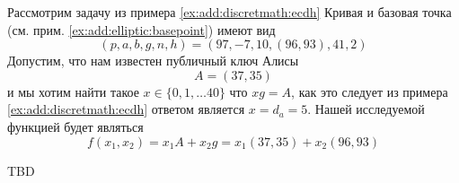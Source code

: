 \begin{example}
Рассмотрим задачу из примера \ref{ex:add:discretmath:ecdh}
Кривая и базовая точка (см. прим. \ref{ex:add:elliptic:basepoint})
имеют вид
\[
(p,a,b,g,n,h) = (97, -7, 10, (96,93), 41, 2)
\]
Допустим, что нам известен публичный ключ Алисы
\[
A = (37, 35)
\]
и мы хотим найти такое $x \in \{0,1, \dots 40\}$ что
$x g = A$, как это следует из примера \ref{ex:add:discretmath:ecdh}
ответом является $x = d_a  = 5$.
Нашей исследуемой функцией будет являться
\[
f\left(x_1,x_2\right) = x_1 A + x_2 g = x_1 (37,35) + x_2 (96,93)
\]





TBD
\end{example}
